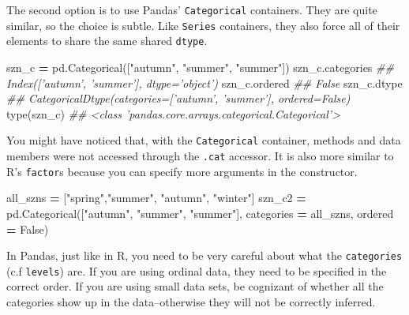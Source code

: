 \documentclass[12pt,krantz2]{krantz}
\makeatletter
\newenvironment{Shaded}{\begin{snugshade}}{\end{snugshade}}
\newcommand{\BuiltInTok}[1]{#1}
\newcommand{\CommentTok}[1]{\textcolor[rgb]{0.37,0.37,0.37}{\textit{#1}}}
\newcommand{\NormalTok}[1]{#1}
\newcommand{\OperatorTok}[1]{\textcolor[rgb]{0.43,0.43,0.43}{\textbf{#1}}}
\newcommand{\StringTok}[1]{\textcolor[rgb]{0.5,0.5,0.5}{#1}}
\newcommand{\VariableTok}[1]{\textcolor[rgb]{0,0,0}{#1}}
\newenvironment{kframe}{%
\medskip{}
\setlength{\fboxsep}{.8em}
 \def\at@end@of@kframe{}%
 \ifinner\ifhmode%
  \def\at@end@of@kframe{\end{minipage}}%
  \begin{minipage}{\columnwidth}%
 \fi\fi%
 \def\FrameCommand##1{\hskip\@totalleftmargin \hskip-\fboxsep
 \colorbox{shadecolor}{##1}\hskip-\fboxsep
     \hskip-\linewidth \hskip-\@totalleftmargin \hskip\columnwidth}%
 \MakeFramed {\advance\hsize-\width
   \@totalleftmargin\z@ \linewidth\hsize
   \@setminipage}}%
 {\par\unskip\endMakeFramed%
 \at@end@of@kframe}
\renewenvironment{Shaded}{\begin{kframe}}{\end{kframe}}
\makeatother
\begin{document}
The second option is to use Pandas' \texttt{Categorical} containers. They are quite similar, so the choice is subtle. Like \texttt{Series} containers, they also force all of their elements to share the same shared \texttt{dtype}.

\begin{Shaded}
\begin{Highlighting}[]
\NormalTok{szn_c }\OperatorTok{=}\NormalTok{ pd.Categorical([}\StringTok{"autumn"}\NormalTok{, }\StringTok{"summer"}\NormalTok{, }\StringTok{"summer"}\NormalTok{])}
\NormalTok{szn_c.categories}
\CommentTok{## Index(['autumn', 'summer'], dtype='object')}
\NormalTok{szn_c.ordered}
\CommentTok{## False}
\NormalTok{szn_c.dtype}
\CommentTok{## CategoricalDtype(categories=['autumn', 'summer'], ordered=False)}
\BuiltInTok{type}\NormalTok{(szn_c)}
\CommentTok{## <class 'pandas.core.arrays.categorical.Categorical'>}
\end{Highlighting}
\end{Shaded}

You might have noticed that, with the \texttt{Categorical} container, methods and data members were not accessed through the \texttt{.cat} accessor. It is also more similar to R's \texttt{factor}s because you can specify more arguments in the constructor.

\begin{Shaded}
\begin{Highlighting}[]
\NormalTok{all_szns }\OperatorTok{=}\NormalTok{ [}\StringTok{"spring"}\NormalTok{,}\StringTok{"summer"}\NormalTok{, }\StringTok{"autumn"}\NormalTok{, }\StringTok{"winter"}\NormalTok{]}
\NormalTok{szn_c2 }\OperatorTok{=}\NormalTok{ pd.Categorical([}\StringTok{"autumn"}\NormalTok{, }\StringTok{"summer"}\NormalTok{, }\StringTok{"summer"}\NormalTok{], }
\NormalTok{                        categories }\OperatorTok{=}\NormalTok{ all_szns, }
\NormalTok{                        ordered }\OperatorTok{=} \VariableTok{False}\NormalTok{)}
\end{Highlighting}
\end{Shaded}

\begin{rmd-caution}
In Pandas, just like in R, you need to be very careful about what the \texttt{categories} (c.f \texttt{levels}) are. If you are using ordinal data, they need to be specified in the correct order. If you are using small data sets, be cognizant of whether all the categories show up in the data--otherwise they will not be correctly inferred.

\end{rmd-caution}
\end{document}
